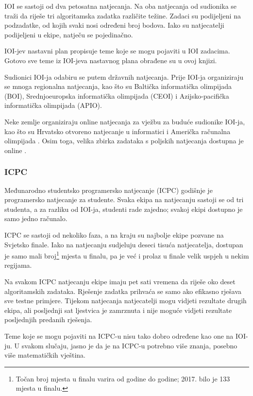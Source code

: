 IOI se sastoji od dva petosatna natjecanja.
Na oba natjecanja od sudionika se traži da
riješe tri algoritamska zadatka različite težine.
Zadaci su podijeljeni na podzadatke,
od kojih svaki nosi određeni broj bodova.
Iako su natjecatelji podijeljeni u ekipe,
natječu se pojedinačno.

IOI-jev nastavni plan \cite{iois} propisuje teme
koje se mogu pojaviti u IOI zadacima.
Gotovo sve teme iz IOI-jeva nastavnog plana
obrađene su u ovoj knjizi.

Sudionici IOI-ja odabiru se putem
državnih natjecanja.
Prije IOI-ja organiziraju se mnoga regionalna natjecanja,
kao što su Baltička informatička olimpijada (BOI),
Srednjoeuropska informatička olimpijada (CEOI)
i Azijsko-pacifička informatička olimpijada (APIO).

Neke zemlje organiziraju online natjecanja za vježbu
za buduće sudionike IOI-ja,
kao što su Hrvatsko otvoreno natjecanje u informatici \cite{coci}
i Američka računalna olimpijada \cite{usaco}.
Osim toga, velika zbirka zadataka s poljskih natjecanja
dostupna je online \cite{main}.

\subsubsection{ICPC}

Međunarodno studentsko programersko natjecanje (ICPC)
godišnje je programersko natjecanje za studente.
Svaka ekipa na natjecanju sastoji se od tri studenta,
a za razliku od IOI-ja, studenti rade zajedno;
svakoj ekipi dostupno je samo jedno računalo.

ICPC se sastoji od nekoliko faza, a na kraju su
najbolje ekipe pozvane na Svjetsko finale.
Iako na natjecanju sudjeluju deseci tisuća
natjecatelja, dostupan je samo mali broj\footnote{Točan broj mjesta
u finalu varira od godine do godine; 2017. bilo je 133 mjesta u finalu.} mjesta u finalu,
pa je već i prolaz u finale
velik uspjeh u nekim regijama.

Na svakom ICPC natjecanju ekipe imaju pet sati vremena da
riješe oko deset algoritamskih zadataka.
Rješenje zadatka prihvaća se samo ako efikasno rješava
sve testne primjere.
Tijekom natjecanja natjecatelji mogu vidjeti rezultate drugih ekipa,
ali posljednji sat ljestvica je zamrznuta i nije
moguće vidjeti rezultate posljednjih predanih rješenja.

Teme koje se mogu pojaviti na ICPC-u nisu tako dobro
određene kao one na IOI-ju.
U svakom slučaju, jasno je da je na ICPC-u potrebno
više znanja, posebno više matematičkih vještina.

